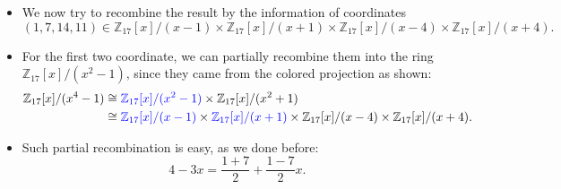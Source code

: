 \begin{frame}
    \begin{itemize}
        \item We now try to recombine the result by the information of coordinates
            \[
            (1, 7, 14, 11)\in 
                \mathbb{Z}_{17}[x]/(x-1) \times 
                \mathbb{Z}_{17}[x]/(x+1) \times 
                \mathbb{Z}_{17}[x]/(x-4) \times 
                \mathbb{Z}_{17}[x]/(x+4).
            \]
        \item For the first two coordinate, we can partially recombine them into the ring 
            \( \mathbb{Z}_{17}[x]/(x^{2}-1) \), since they came from the colored projection as shown:
            \begin{align*}
                \mathbb{Z}_{17}[x]/(x^{4}-1) 
                &\cong 
                {\color{blue}\mathbb{Z}_{17}[x]/(x^{2}-1)}\times 
                \mathbb{Z}_{17}[x]/(x^{2}+1)\\
                &\cong 
                {\color{blue}\mathbb{Z}_{17}[x]/(x-1)} \times 
                {\color{blue}\mathbb{Z}_{17}[x]/(x+1)} \times 
                \mathbb{Z}_{17}[x]/(x-4) \times 
                \mathbb{Z}_{17}[x]/(x+4).
            \end{align*}
        \item Such partial recombination is easy, as we done before:
            \[
                4 - 3x = \frac{1+7}{2} + \frac{1-7}{2}x .
            \]

    \end{itemize}
\end{frame}



